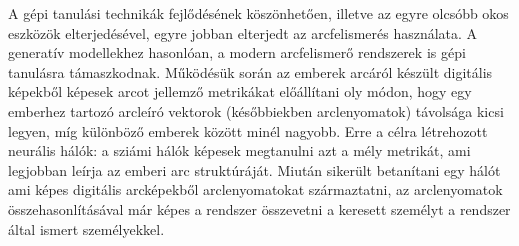 





A gépi tanulási technikák fejlődésének köszönhetően, illetve az egyre olcsóbb okos eszközök elterjedésével, egyre jobban elterjedt az arcfelismerés használata. A generatív modellekhez hasonlóan, a modern arcfelismerő rendszerek is gépi tanulásra támaszkodnak. Működésük során az emberek arcáról készült digitális képekből képesek arcot jellemző metrikákat előállítani oly módon, hogy egy emberhez tartozó arcleíró vektorok (későbbiekben arclenyomatok) távolsága kicsi legyen, míg különböző emberek között minél nagyobb. Erre a célra létrehozott neurális hálók: a sziámi hálók képesek megtanulni azt a mély metrikát, ami legjobban leírja az emberi arc struktúráját. Miután sikerült betanítani egy hálót ami képes digitális arcképekből arclenyomatokat származtatni, az arclenyomatok összehasonlításával már képes a rendszer összevetni a keresett személyt a rendszer által ismert személyekkel.

